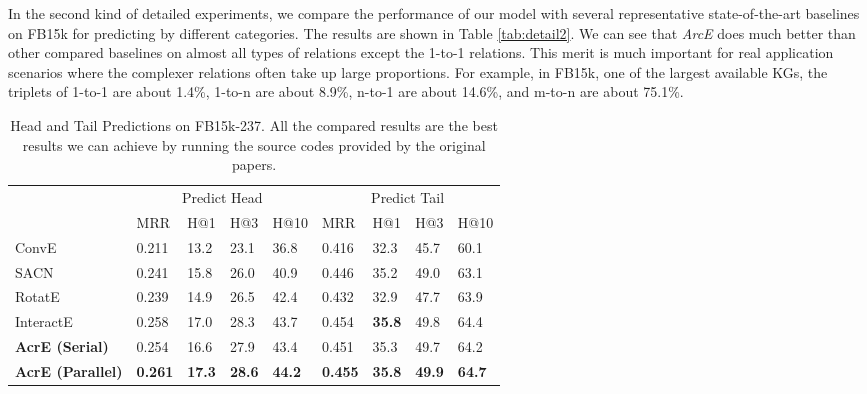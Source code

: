 \documentclass[11pt]{article}
\begin{document}
In the second kind of detailed experiments,  we  compare the performance of our model with several representative state-of-the-art baselines on {FB15k} for predicting by different categories.
The results are shown in Table \ref{tab:detail2}. We can see that {\em ArcE}
does much better than other compared baselines on almost all types of relations except the 1-to-1 relations. 
This merit is much important for real application scenarios where the complexer relations often take up large proportions. For example, in FB15k, one of the largest available KGs, the triplets of 1-to-1 are about 1.4\%, 1-to-n are about 8.9\%, n-to-1 are about 14.6\%, and m-to-n are about  75.1\%. 



\begin{table}[t]\centering
	\resizebox{\textwidth}{!}
	{\begin{tabular}{lp{0.5em}p{0.5em}p{0.5em}p{0.5em}p{0.5em}p{0.5em}p{0.5em}p{0.5em}}
			\hline
			\multicolumn{1}{r}{} & \multicolumn{4}{c}{Predict Head}  & \multicolumn{4}{c}{Predict Tail} \\
			\cmidrule{2-9} 
			\multicolumn{1}{r}{} &  \multicolumn{1}{l}{MRR} & \multicolumn{1}{l}{H@1} & \multicolumn{1}{l}{H@3} & \multicolumn{1}{l}{H@10}& \multicolumn{1}{l}{MRR} & \multicolumn{1}{l}{H@1} & \multicolumn{1}{l}{H@3} & \multicolumn{1}{l}{H@10} \\
			\hline
ConvE\footnotesize{\cite{Dettmers:2018}}    & 0.211  & 13.2  & 23.1 & 36.8    & 0.416 & 32.3  & 45.7    & 60.1 \\
			SACN\footnotesize{\cite{Shang:2019}}     & 0.241  & 15.8  & 26.0 & 40.9   & 0.446 & 35.2  & 49.0    & { 63.1}\\ 
			
			
			
			
			RotatE\footnotesize{\cite{Sun:2019}}    & 0.239 & 14.9  & 26.5    & 42.4    & 0.432  & 32.9  & 47.7 & 63.9 \\


InteractE\footnotesize{\cite{Vashishth:2020a}}     &0.258&17.0&28.3&43.7&0.454&{\bf 35.8}&49.8& 64.4  \\
\hline
			{\bf AcrE (Serial)}  & {0.254} & {16.6} & {27.9} &{43.4}   &{0.451} &{35.3} &{49.7} &{64.2}     \\
			{\bf AcrE (Parallel)}  & {\bf 0.261} & {\bf 17.3} & {\bf 28.6} &{ \bf 44.2}   &{\bf 0.455} &{\bf 35.8} &{\bf 49.9} &{\bf 64.7}     \\
			\hline
	\end{tabular}}

	\caption{Head and Tail Predictions on FB15k-237. All the compared results are the best results we can achieve by running the source codes provided by the original papers. }
	\label{tab:detail1}\end{table}
\end{document}
